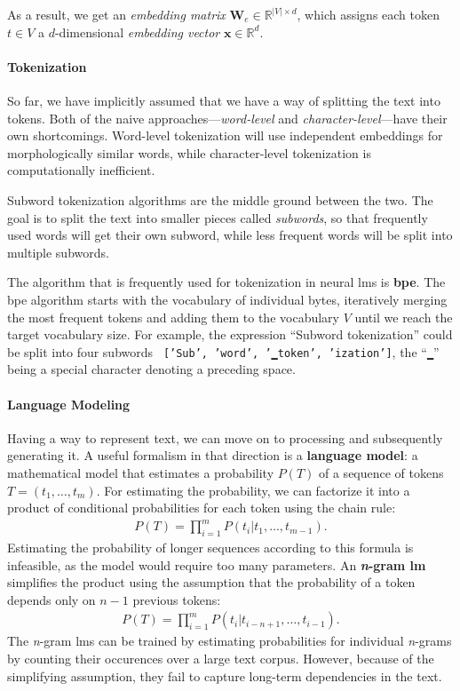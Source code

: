 As a result, we get an \textit{embedding matrix} $\mathbf{W}_e \in \mathbb{R}^{|V|\times d}$, which assigns each token $t \in V$ a $d$-dimensional \textit{embedding vector} $\mathbf{x} \in \mathbb{R}^{d}$.

\paragraph{Tokenization} So far, we have implicitly assumed that we have a way of splitting the text into tokens. Both of the naive approaches---\textit{word-level} and \textit{character-level}---have their own shortcomings. Word-level tokenization will use independent embeddings for morphologically similar words, while character-level tokenization is computationally inefficient.

Subword tokenization algorithms are the middle ground between the two. The goal is to split the text into smaller pieces called \emph{subwords}, so that frequently used words will get their own subword, while less frequent words will be split into multiple subwords.

The algorithm that is frequently used for tokenization in neural \acp{lm} is \textbf{\ac{bpe}}. The \ac{bpe} algorithm starts with the vocabulary of individual bytes, iteratively merging the most frequent tokens and adding them to the vocabulary $V$ until we reach the target vocabulary size. For example, the expression ``Subword tokenization'' could be split into four subwords \texttt{ ['Sub', 'word', '▁token', 'ization']}, the ``\texttt{▁}'' being a special character denoting a preceding space.

\paragraph{Language Modeling} Having a way to represent text, we can move on to processing and subsequently generating it. A useful formalism in that direction is a \textbf{language model}: a mathematical model that estimates a probability $P(T)$ of a sequence of tokens $T = (t_1, \ldots, t_m)$. For estimating the probability, we can factorize it into a product of conditional probabilities for each token using the chain rule:
\begin{align}
    P(T) = \prod_{i=1}^m P(t_i|t_1, \hdots,t_{m-1}).
\end{align}
Estimating the probability of longer sequences according to this formula is infeasible, as the model would require too many parameters. An \textbf{\emph{n}-gram \ac{lm}} simplifies the product using the assumption that the probability of a token depends only on $n-1$ previous tokens:
\begin{align}
    P(T) = \prod_{i=1}^m P(t_i|t_{i-n+1}, \hdots,t_{i-1}).
\end{align}
The \emph{n}-gram \acp{lm} can be trained by estimating probabilities for individual \emph{n}-grams by counting their occurences over a large text corpus. However, because of the simplifying assumption, they fail to capture long-term dependencies in the text.

